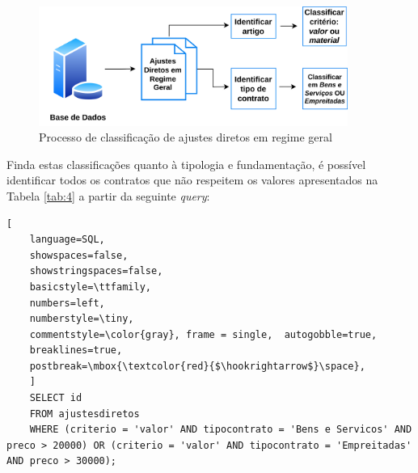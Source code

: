 \begin{figure}[H]
	\centering
	\includegraphics[width=0.9\textwidth]{imagens/rf1.png}
	\caption{Processo de classificação de ajustes diretos em regime geral}
	\label{}
\end{figure}




%	

%	
%	


Finda estas classificações quanto à tipologia e fundamentação, é possível identificar todos os contratos que não respeitem os valores apresentados na Tabela \ref{tab:4} a partir da seguinte \textit{query}: 

\begin{lstlisting}[
	language=SQL,
	showspaces=false,
	showstringspaces=false,
	basicstyle=\ttfamily,
	numbers=left,
	numberstyle=\tiny,
	commentstyle=\color{gray}, frame = single,	autogobble=true,
	breaklines=true,
	postbreak=\mbox{\textcolor{red}{$\hookrightarrow$}\space},
	]
	SELECT id
	FROM ajustesdiretos
	WHERE (criterio = 'valor' AND tipocontrato = 'Bens e Servicos' AND preco > 20000) OR (criterio = 'valor' AND tipocontrato = 'Empreitadas' AND preco > 30000);
\end{lstlisting}

